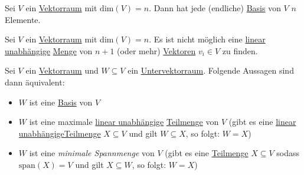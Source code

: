 \documentclass[../../main.tex]{subfiles}
\begin{document}
	\begin{theorem}
		Sei $V$ ein \hyperref[def:Vektorraum]{Vektorraum} mit $\textrm{dim}(V)=n$. Dann hat jede (endliche) \hyperref[def:Basis]{Basis} von $V$ $n$ Elemente.
	\end{theorem}

	\begin{theorem}
		Sei $V$ ein \hyperref[def:Vektorraum]{Vektorraum} mit $\textrm{dim}(V)=n$. Es ist nicht möglich eine \hyperref[def:LineareUnabhängigkeitMenge]{linear unabhängige} \hyperref[def:Menge]{Menge} von $n+1$ (oder mehr) \hyperref[def:Vektor]{Vektoren} $v_i \in V$ zu finden.
	\end{theorem}

	\begin{theorem}
		Sei $V$ ein \hyperref[def:Vektorraum]{Vektorraum} und $W \subseteq V$ ein \hyperref[def:Untervektorraum]{Untervektorraum}. Folgende Aussagen sind dann äquivalent:
		\begin{itemize}
			\item $W$ ist eine \hyperref[def:Basis]{Basis} von $V$
			\item $W$ ist eine maximale \hyperref[def:LineareUnabhängigkeitMenge]{linear unabhängige} \hyperref[def:Teilmenge]{Teilmenge} von $V$ (gibt es eine \hyperref[def:LineareUnabhängigkeitMenge]{linear unabhängige}\hyperref[def:Teilmenge]{Teilmenge} $X \subseteq V$ und gilt $W \subseteq X$, so folgt: $W = X$)
			\item $W$ ist eine \textit{minimale Spannmenge} von $V$ (gibt es eine \hyperref[def:Teilmenge]{Teilmenge} $X\subseteq V$ sodass $\textrm{span}(X)=V$ und gilt $X \subseteq W$, so folgt: $W = X$)
		\end{itemize}
	\end{theorem}
\end{document}
